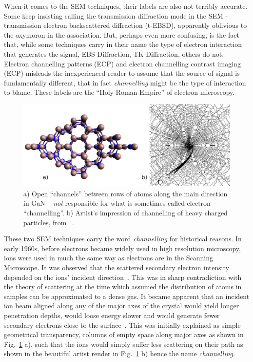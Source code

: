 When it comes to the SEM techniques, their labels are also not terribly accurate. Some keep insisting calling the transmission diffraction  mode in the SEM - transmission electron backscattered diffraction (t-EBSD), apparently oblivious to the oxymoron in the  association. But, perhaps even more confusing, is the fact that, while some techniques carry in their name the type of electron interaction that generates the signal, EBS-Diffraction, TK-Diffraction, others do not. Electron channelling patterns (ECP) and electron channelling contrast imaging (ECP) misleads the inexperienced reader to assume that the source of signal is fundamentally different, that in fact \textit{channelling} might be the type of interaction to blame. These labels are the ``Holy Roman Empire'' of electron microscopy. 

\begin{figure}[!h]
    \centering
\includegraphics[width=1\linewidth]{Figures/channel2.png}
\caption[``Channels'']{ a) Open ``channels'' between rows of atoms along the main direction \hkl[001] in GaN -- \emph{not} responsible for what is sometimes called electron ``channelling''. b) Artist's impression of channelling of heavy charged particles, from~\cite{Brandt68} .}
\label{Fig:channels}
\end{figure}


These two SEM techniques carry the word \textit{channelling} for historical reasons. In early 1960s, before electrons became widely used in high resolution microscopy, ions were used in much the same way as electrons are in the Scanning Microscope. It was observed that the scattered secondary electron intensity depended on the ions' incident direction~\cite{Davies83}. This was in sharp contradiction with the 
theory of scattering at the time which assumed the distribution of atoms in samples can be approximated to a dense gas. It became apparent that an incident ion beam aligned along any of the major axes of the crystal would yield longer penetration depths, would loose energy slower and would generate fewer secondary electrons close to the surface~\cite{Piercy63}. This was initially explained as simple geometrical transparency, \ie columns of empty space along major axes as shown in Fig.~\ref{Fig:channels} a), such that the ions would simply suffer less scattering on their path as shown in the beautiful artist render in Fig.~\ref{Fig:channels} b) hence the name \textit{channelling}.


